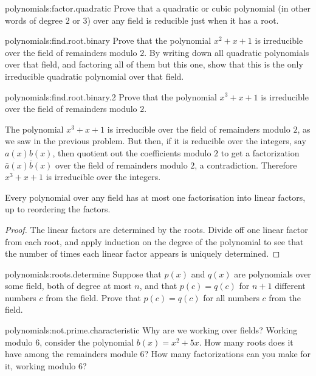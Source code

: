 \begin{problem}{polynomials:factor.quadratic}
Prove that a quadratic or cubic polynomial (in other words of degree \(2\) or \(3\)) over any field is reducible just when it has a root.
\end{problem}
\begin{problem}{polynomials:find.root.binary}
Prove that the polynomial \(x^2+x+1\) is irreducible over the field of remainders modulo \(2\).
By writing down all quadratic polynomials over that field, and factoring all of them but this one, show that this is the only irreducible quadratic polynomial over that field.
\end{problem}
\begin{problem}{polynomials:find.root.binary.2}
Prove that the polynomial \(x^3+x+1\) is irreducible over the field of remainders modulo \(2\).
\end{problem}
\begin{example}
The polynomial \(x^3+x+1\) is irreducible over the field of remainders modulo \(2\), as we saw in the previous problem.
But then, if it is reducible over the integers, say \(a(x)b(x)\), then quotient out the coefficients modulo \(2\) to get a factorization \(\bar{a}(x)\bar{b}(x)\) over the field of remainders modulo \(2\), a contradiction.
Therefore \(x^3+x+1\) is irreducible over the integers.  
\end{example}
\begin{corollary}
Every polynomial over any field has at most one factorisation into linear factors, up to reordering the factors.
\end{corollary}
\begin{proof}
The linear factors are determined by the roots.
Divide off one linear factor from each root, and apply induction on the degree of the polynomial to see that the number of times each linear factor appears is uniquely determined.
\end{proof}
\begin{problem}{polynomials:roots.determine}
Suppose that \(p(x)\) and \(q(x)\) are polynomials over some field, both of degree at most \(n\), and that \(p(c)=q(c)\) for \(n+1\) different numbers \(c\) from the field.
Prove that \(p(c)=q(c)\) for all numbers \(c\) from the field.
\end{problem}
\begin{problem}{polynomials:not.prime.characteristic}
Why are we working over fields?
Working modulo \(6\), consider the polynomial \(b(x)=x^2+5x\).
How many roots does it have among the remainders module \(6\)?
How many factorizations can you make for it, working modulo \(6\)?
\end{problem}
